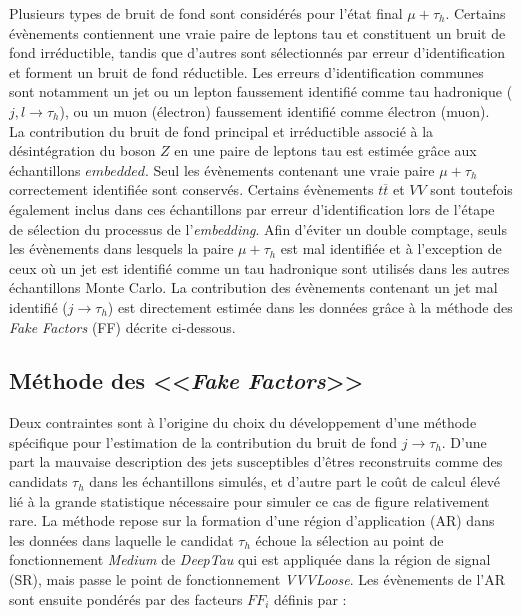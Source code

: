 Plusieurs types de bruit de fond sont considérés pour l'état final $\mu+\tau_h$. Certains évènements contiennent une vraie paire de leptons tau et constituent un bruit de fond irréductible, tandis que d'autres sont sélectionnés par erreur d'identification et forment un bruit de fond réductible. Les erreurs d'identification communes sont notamment un jet ou un lepton faussement identifié comme tau hadronique ($j,l\rightarrow\tau_h$), ou un muon (électron) faussement identifié comme électron (muon). \\

La contribution du bruit de fond principal et irréductible associé à la désintégration du boson $Z$ en une paire de leptons tau est estimée grâce aux échantillons $\textit{embedded}$. Seul les évènements contenant une vraie paire $\mu+\tau_h$ correctement identifiée sont conservés. Certains évènements $t\overline{t}$ et $VV$ sont toutefois également inclus dans ces échantillons par erreur d'identification lors de l'étape de sélection du processus de l'\textit{embedding}. Afin d'éviter un double comptage, seuls les évènements dans lesquels la paire $\mu+\tau_h$ est mal identifiée et à l'exception de ceux où un jet est identifié comme un tau hadronique sont utilisés dans les autres échantillons Monte Carlo. La contribution des évènements contenant un jet mal identifié ($j\rightarrow\tau_h$) est directement estimée dans les données grâce à la méthode des \textit{Fake Factors} (FF) décrite ci-dessous.

\subsection{Méthode des <<\textit{Fake Factors}>>}

Deux contraintes sont à l'origine du choix du développement d'une méthode spécifique pour l'estimation de la contribution du bruit de fond $j\rightarrow\tau_h$. D'une part la mauvaise description des jets susceptibles d'êtres reconstruits comme des candidats $\tau_h$ dans les échantillons simulés, et d'autre part le coût de calcul élevé lié à la grande statistique nécessaire pour simuler ce cas de figure relativement rare. La méthode repose sur la formation d'une région d'application (AR) dans les données dans laquelle le candidat $\tau_h$ échoue la sélection au point de fonctionnement \textit{Medium} de \textit{DeepTau} qui est appliquée dans la région de signal (SR), mais passe le point de fonctionnement \textit{VVVLoose}. Les évènements de l'AR sont ensuite pondérés par des facteurs $FF_i$ définis par :

